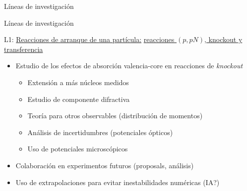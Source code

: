 \documentclass{beamer}
\begin{document}
\begin{frame}{Líneas de investigación}
\begin{center}
\end{center}
    
\end{frame}

\begin{frame}{Líneas de investigación} 

\large {}  L1: \underline{Reacciones de arranque de una partícula:} \underline{reacciones $(p, pN )$, knockout y transferencia}

\normalsize
    
\begin{itemize}
\item Estudio de los efectos de absorción valencia-core en reacciones de \textit{knockout}
\begin{itemize}
\item Extensión a más núcleos medidos
\item Estudio de componente difractiva
\item Teoría para otros observables (distribución de momentos)
\item Análisis de incertidumbres (potenciales ópticos)
\item Uso de potenciales microscópicos
\end{itemize}

\item Colaboración en experimentos futuros (proposals, análisis)
\item Uso de extrapolaciones para evitar inestabilidades numéricas (IA?)
\end{itemize}    
    
\end{frame}
\end{document}
